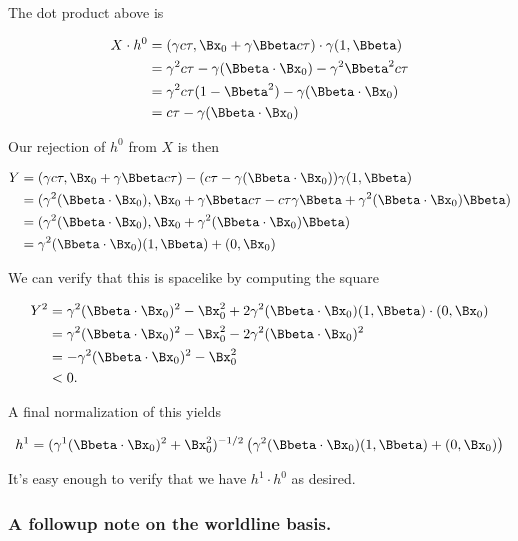 The dot product above is

\begin{align*}
X \cdot h^0
&=
( \gamma c \tau, \Bx_0 + \gamma \Bbeta c \tau ) \cdot \gamma (1, \Bbeta) \\
&=
\gamma^2 c \tau - \gamma (\Bbeta \cdot \Bx_0) - \gamma^2 \Bbeta^2 c \tau \\
&=
\gamma^2 c \tau ( 1 - \Bbeta^2) - \gamma (\Bbeta \cdot \Bx_0) \\
&=
c \tau - \gamma (\Bbeta \cdot \Bx_0)
\end{align*}

Our rejection of $h^0$ from $X$ is then

\begin{align*}
Y 
&= ( \gamma c \tau, \Bx_0 + \gamma \Bbeta c \tau ) - (c \tau - \gamma (\Bbeta \cdot \Bx_0)) \gamma( 1, \Bbeta) \\
&= ( \gamma^2 (\Bbeta \cdot \Bx_0), \Bx_0 + \gamma \Bbeta c \tau - c \tau \gamma \Bbeta + \gamma^2 (\Bbeta \cdot \Bx_0) \Bbeta ) \\
&= ( \gamma^2 (\Bbeta \cdot \Bx_0), \Bx_0 + \gamma^2 (\Bbeta \cdot \Bx_0) \Bbeta ) \\
&= \gamma^2 (\Bbeta \cdot \Bx_0)(1, \Bbeta) + (0, \Bx_0)
\end{align*}

We can verify that this is spacelike by computing the square

\begin{align*}
Y^2 
&= \gamma^2 (\Bbeta \cdot \Bx_0)^2 - \Bx_0^2 + 2 \gamma^2 (\Bbeta \cdot \Bx_0) (1, \Bbeta) \cdot (0, \Bx_0) \\
&= \gamma^2 (\Bbeta \cdot \Bx_0)^2 - \Bx_0^2 - 2 \gamma^2 (\Bbeta \cdot \Bx_0)^2 \\
&= -\gamma^2 (\Bbeta \cdot \Bx_0)^2 - \Bx_0^2 \\
&< 0.
\end{align*}

A final normalization of this yields

\begin{equation}\label{eqn:relativisticElectrodynamicsT2:900}
h^1 = (\gamma^1 (\Bbeta \cdot \Bx_0)^2 + \Bx_0^2)^{-1/2} \left( \gamma^2 (\Bbeta \cdot \Bx_0)(1, \Bbeta) + (0, \Bx_0) \right)
\end{equation}

It's easy enough to verify that we have $h^1 \cdot h^0$ as desired.

\subsubsection{A followup note on the worldline basis.}

